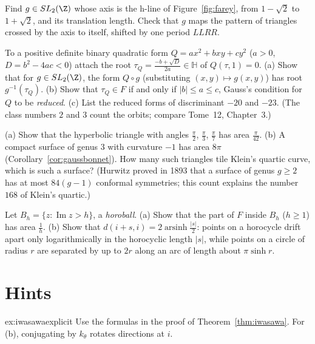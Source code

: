 \begin{exercise}[$\star$]\label{ex:sqrt2axis}
Find $g\in SL_2(\Z)$ whose axis is the h-line of Figure~\ref{fig:farey}, from $1-\sqrt2$ to $1+\sqrt2$, and its translation length. Check that $g$ maps the pattern of triangles crossed by the axis to
itself, shifted by one period $LLRR$.
\end{exercise}

\begin{exercise}[$\star\star$]\label{ex:formsreduction}
To a positive definite binary quadratic form $Q=ax^2+bxy+cy^2$ ($a>0$, $D=b^2-4ac<0$) attach the root $\tau_Q=\frac{-b+\sqrt D}{2a}\in\mathbb H$ of $Q(\tau,1)=0$. (a) Show that for $g\in SL_2(\Z)$, the
form $Q\circ g$ (substituting $(x,y)\mapsto g(x,y)$) has root $g^{-1}(\tau_Q)$. (b) Show that $\tau_Q\in F$ if and only if $|b|\le a\le c$, Gauss's condition for $Q$ to be \emph{reduced}. (c) List the reduced forms of
discriminant $-20$ and $-23$. (The class numbers $2$ and $3$ count the orbits; compare Tome~12, Chapter~3.)
\end{exercise}

\begin{exercise}[$\star$]\label{ex:klein336}
(a) Show that the hyperbolic triangle with angles $\frac\pi2$, $\frac\pi3$, $\frac\pi7$ has area $\frac\pi{42}$. (b) A compact surface of genus $3$ with curvature $-1$ has area $8\pi$ (Corollary~\ref{cor:gaussbonnet}). How many
such triangles tile Klein's quartic curve, which is such a surface? (Hurwitz proved in 1893 that a surface of genus $g\ge2$ has at most $84(g-1)$ conformal symmetries; this count explains the number
$168$ of Klein's quartic.)
\end{exercise}

\begin{exercise}[$\star\star$]\label{ex:horocyclearea}
Let $B_h=\{z:\operatorname{Im}z>h\}$, a \emph{horoball}. (a) Show that the part of $F$ inside $B_h$ ($h\ge1$) has area $\frac1h$. (b) Show that $d(i+s,i)=2\operatorname{arsinh}\frac{|s|}2$: points on a horocycle drift apart
only logarithmically in the horocyclic length $|s|$, while points on a circle of radius $r$ are separated by up to $2r$ along an arc of length about $\pi\sinh r$.
\end{exercise}

\section{Hints}

\begin{hint}{ex:iwasawaexplicit}
Use the formulas in the proof of Theorem~\ref{thm:iwasawa}. For (b), conjugating by $k_\theta$ rotates directions at $i$.
\end{hint}

